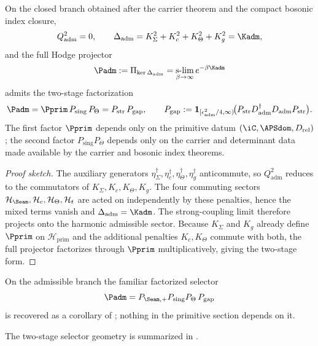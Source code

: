\begin{theorem}
\label{thm:padm-upgrade}
On the closed branch obtained after the carrier theorem and the compact bosonic index closure,
\[
Q_{\mathrm{adm}}^2=0,
\qquad
\Delta_{\mathrm{adm}}=K_\Sigma^2+K_c^2+K_\Theta^2+K_g^2=\Kadm,
\]
and the full Hodge projector
\[
\Padm
:=
\Pi_{\ker\Delta_{\mathrm{adm}}}
=
\operatorname*{s-lim}_{\beta\to\infty}e^{-\beta\Kadm}
\]
admits the two-stage factorization
\[
\Padm
=
\Pprim\,P_{\mathrm{sing}}\,P_\Theta
=
P_{\mathrm{str}}\,P_{\mathrm{gap}},
\qquad
P_{\mathrm{gap}}
:=
\mathbf 1_{[\epsilon_{\mathrm{adm}}^2/4,\infty)}\!\bigl(P_{\mathrm{str}}D_{\mathrm{adm}}^\dagger D_{\mathrm{adm}}P_{\mathrm{str}}\bigr).
\]
The first factor $\Pprim$ depends only on the primitive datum
$(\iC,\APSdom,D_{\mathrm{rel}})$; the second factor $P_{\mathrm{sing}}P_\Theta$ depends only on
the carrier and determinant data made available by the carrier and bosonic index theorems.
\end{theorem}

\begin{proof}[Proof sketch]
The auxiliary generators $\eta_\Sigma^\dagger,\eta_c^\dagger,\eta_\Theta^\dagger,\eta_g^\dagger$
anticommute, so $Q_{\mathrm{adm}}^2$ reduces to the commutators of $K_\Sigma,K_c,K_\Theta,K_g$.
The four commuting sectors $\mathcal H_\Seam,\mathcal H_c,\mathcal H_\Theta,\mathcal H_t$ are
acted on independently by these penalties, hence the mixed terms vanish and $\Delta_{\mathrm{adm}}=\Kadm$. The strong-coupling limit therefore projects onto the harmonic
admissible sector. Because $K_\Sigma$ and $K_g$ already define $\Pprim$ on
$\mathcal H_{\mathrm{prim}}$ and the additional penalties $K_c,K_\Theta$ commute with both, the
full projector factorizes through $\Pprim$ multiplicatively, giving the two-stage form.
\end{proof}

\begin{corollary}
\label{cor:factorized-admissibility-selector}
On the admissible branch the familiar factorized selector
\[
\Padm=P_{\Seam,+}P_{\mathrm{sing}}P_\Theta\,P_{\mathrm{gap}}
\]
is recovered as a corollary of ; nothing in the primitive section depends
on it.
\end{corollary}

The two-stage selector geometry is summarized in .

